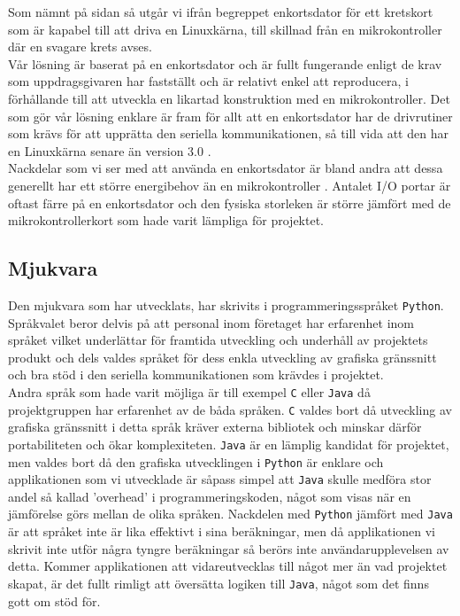 \documentclass{article}
\begin{document}
            Som nämnt på sidan \pageref{sub:beteckningar} så utgår vi ifrån begreppet enkortsdator för ett kretskort som är kapabel till att driva en Linuxkärna, till skillnad från en mikrokontroller där en svagare krets avses.\\

            \noindent Vår lösning är baserat på en enkortsdator och är fullt fungerande enligt de krav som uppdragsgivaren har fastställt och är relativt enkel att reproducera, i förhållande till att utveckla en likartad konstruktion med en mikrokontroller. Det som gör vår lösning enklare är fram för allt att en enkortsdator har de drivrutiner som krävs för att upprätta den seriella kommunikationen, så till vida att den har en Linuxkärna senare än version 3.0 \cite{silicon}. \\

            \noindent Nackdelar som vi ser med att använda en enkortsdator är bland andra att dessa generellt har ett större energibehov än en mikrokontroller \cite{gadgetBlog, rasp}. Antalet I/O portar är oftast färre på en enkortsdator och den fysiska storleken är större jämfört med de mikrokontrollerkort som hade varit lämpliga för projektet.\\


        \subsection{Mjukvara} %
        \label{sub:d_mjukvara}

            Den mjukvara som har utvecklats, har skrivits i programmeringsspråket \texttt{Python}. Språk\-valet beror delvis på att personal inom företaget har erfarenhet inom språket vilket underlättar för framtida utveckling och underhåll av projektets produkt och dels valdes språket för dess enkla utveckling av grafiska gränssnitt och bra stöd i den seriella kommunikationen som krävdes i projektet. \\

            \noindent Andra språk som hade varit möjliga är till exempel \texttt{C} eller \texttt{Java} då projektgruppen har erfarenhet av de båda språken. \texttt{C} valdes bort då utveckling av grafiska gränssnitt i detta språk kräver externa bibliotek och minskar därför portabiliteten och ökar komplexiteten. \texttt{Java} är en lämplig kandidat för projektet, men valdes bort då den grafiska utvecklingen i \texttt{Python} är enklare och applikationen som vi utvecklade är såpass simpel att \texttt{Java} skulle medföra stor andel så kallad 'overhead' i programmeringskoden, något som visas när en jämförelse görs mellan de olika språken.\cite{Ferg}  Nackdelen med \texttt{Python} jämfört med \texttt{Java} är att språket inte är lika effektivt i sina beräkningar, men då applikationen vi skrivit inte utför några tyngre beräkningar så berörs inte användar\-upplevelsen  av detta. Kommer applikationen att vidareutvecklas till något mer än vad projektet skapat, är det fullt rimligt att översätta logiken till \texttt{Java}, något som det finns gott om stöd för.\cite{jython}
        
\end{document}
